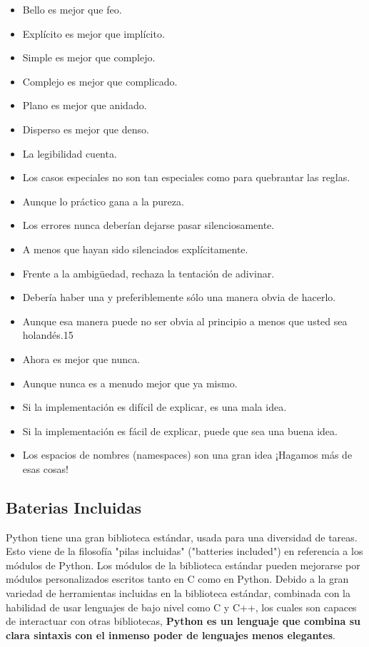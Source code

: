 \begin{itemize}
    \item Bello es mejor que feo.
    \item Explícito es mejor que implícito.
    \item Simple es mejor que complejo.
    \item Complejo es mejor que complicado.
    \item Plano es mejor que anidado.
    \item Disperso es mejor que denso.
    \item La legibilidad cuenta.
    \item Los casos especiales no son tan especiales como para quebrantar las reglas.
    \item Aunque lo práctico gana a la pureza.
    \item Los errores nunca deberían dejarse pasar silenciosamente.
    \item A menos que hayan sido silenciados explícitamente.
    \item Frente a la ambigüedad, rechaza la tentación de adivinar.
    \item Debería haber una y preferiblemente sólo una manera obvia de hacerlo.
    \item Aunque esa manera puede no ser obvia al principio a menos que usted sea holandés.15
    \item Ahora es mejor que nunca.
    \item Aunque nunca es a menudo mejor que ya mismo.
    \item Si la implementación es difícil de explicar, es una mala idea.
    \item Si la implementación es fácil de explicar, puede que sea una buena idea.
    \item Los espacios de nombres (namespaces) son una gran idea ¡Hagamos más de esas cosas!
\end{itemize}


\subsection{Baterias Incluidas}

Python tiene una gran biblioteca estándar, usada para una diversidad de tareas.
Esto viene de la filosofía "pilas incluidas" ("batteries included") en referencia
a los módulos de Python. Los módulos de la biblioteca estándar pueden mejorarse por
módulos personalizados escritos tanto en C como en Python. Debido a la gran
variedad de herramientas incluidas en la biblioteca estándar, combinada con la
habilidad de usar lenguajes de bajo nivel como C y C++, los cuales son capaces
de interactuar con otras bibliotecas, {\bfseries Python es un lenguaje que combina su clara
sintaxis con el inmenso poder de lenguajes menos elegantes}.

